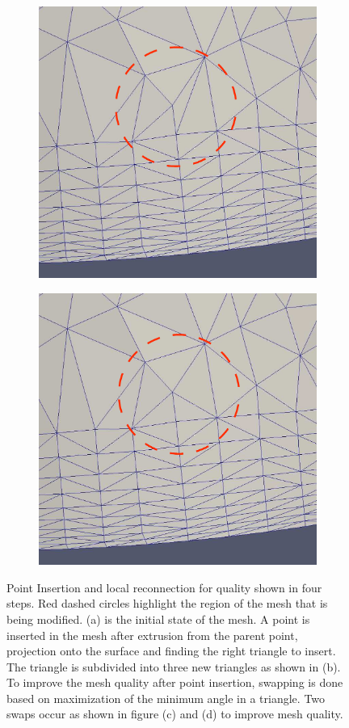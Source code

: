 \begin{figure}
\begin{subfigure}{.5\textwidth}
  \caption{}
  \label{point-insert2}
\end{subfigure}
\begin{subfigure}{.5\textwidth}
  \centering
  \includegraphics[width=.8\linewidth]{img/m1/point-insertion-swapping/swap1.eps}
  \caption{}
  \label{point-insert3}
\end{subfigure}%
\begin{subfigure}{.5\textwidth}
  \centering
  \includegraphics[width=.8\linewidth]{img/m1/point-insertion-swapping/swap2.eps}
  \caption{}
  \label{point-insert4}
\end{subfigure}
\caption{Point Insertion and local reconnection for quality shown in four steps. Red dashed circles highlight the region of the mesh that is being modified. (a) is the initial state of the mesh. A point is inserted in the mesh after extrusion from the parent point, projection onto the surface and finding the right triangle to insert. The triangle is subdivided into three new triangles as shown in (b). To improve the mesh quality after point insertion, swapping is done based on maximization of the minimum angle in a triangle. Two swaps occur as shown in figure (c) and (d) to improve mesh quality.}
\label{point-insert}
\end{figure}

